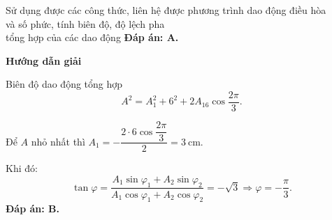 \begin{dang}{Sử dụng được các công thức, liên hệ được phương trình dao động điều hòa\\ và số phức, tính biên độ, độ lệch pha\\ tổng hợp của các dao động}
{		\textbf{Đáp án: A.}
	}
	{\begin{center}
			\textbf{Hướng dẫn giải}
		\end{center}
		
		Biên độ dao động tổng hợp $$A^2 = A_1^2+6^2 + 2A_16 \cos \dfrac{2\pi}{3}.$$
		
		Để $A$ nhỏ nhất thì
		$A_1 = - \dfrac{2 \cdot 6 \cos \dfrac{2\pi}{3}}{2}=3\ \text{cm}.$
		
		Khi đó:
		\begin{equation*}\label{eq2}
			\tan\varphi = 	\dfrac{A_1\sin\varphi_1+A_2\sin\varphi_2}		{A_1\cos\varphi_1+A_2\cos\varphi_2} = -\sqrt 3 \Rightarrow \varphi =- \dfrac{\pi}{3}. 
		\end{equation*}
		\textbf{Đáp án: B.}
	}
	
\end{dang}
